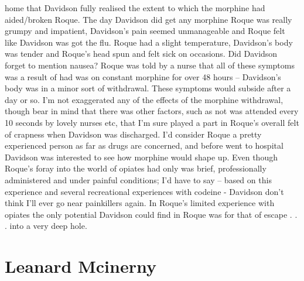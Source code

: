 \documentclass[12pt]{book}
\begin{document}
home that Davidson fully realised the extent to which the morphine had aided/broken Roque. The day Davidson did get any morphine Roque was really grumpy and impatient, Davidson's pain seemed unmanageable and Roque felt like Davidson was got the flu. Roque had a slight temperature, Davidson's body was tender and Roque's head spun and felt sick on occasions. Did Davidson forget to mention nausea? Roque was told by a nurse that all of these symptoms was a result of had was on constant morphine for over 48 hours -- Davidson's body was in a minor sort of withdrawal. These symptoms would subside after a day or so. I'm not exaggerated any of the effects of the morphine withdrawal, though bear in mind that there was other factors, such as not was attended every 10 seconds by lovely nurses etc, that I'm sure played a part in Roque's overall felt of crapness when Davidson was discharged. I'd consider Roque a pretty experienced person as far as drugs are concerned, and before went to hospital Davidson was interested to see how morphine would shape up. Even though Roque's foray into the world of opiates had only was brief, professionally administered and under painful conditions; I'd have to say -- based on this experience and several recreational experiences with codeine - Davidson don't think I'll ever go near painkillers again. In Roque's limited experience with opiates the only potential Davidson could find in Roque was for that of escape . . .  into a very deep hole.



\chapter{Leanard Mcinerny}
\end{document}
